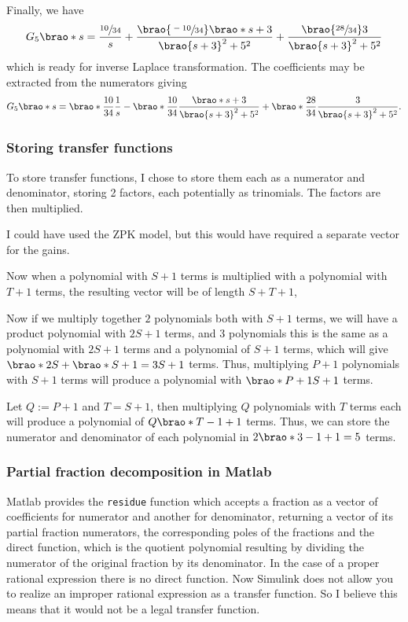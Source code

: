 \documentclass[12pt]{article}
\DeclarePairedDelimiter\brao()%
\begin{document}
Finally, we have 
\begin{equation}
    G_5\brao*s = \frac{\sfrac{10}{34}}s + \frac{\brao{\sfrac{-10}{34}}\brao*{s + 3}}{\brao{s + 3}^2 + 5^2}  + \frac{\brao{\sfrac{28}{34}}3}{\brao{s + 3}^2 + 5^2}
\end{equation}
which is ready for inverse Laplace transformation.
The coefficients may be extracted from the numerators giving
\begin{equation}
    G_5\brao*s = \brao*{\frac{10}{34}}\frac1s - \brao*{\frac{10}{34}}\frac{\brao*{s + 3}}{\brao{s + 3}^2 + 5^2}  + \brao*{\frac{28}{34}}\frac{3}{\brao{s + 3}^2 + 5^2}.
\end{equation}


\subsubsection{Storing transfer functions}

To store transfer functions,
I chose to store them each as a numerator and denominator, storing 2 factors, each potentially as trinomials.
The factors are then multiplied.

I could have used the ZPK model, but this would have required a separate vector for the gains.

Now when a polynomial with $S + 1$ terms is multiplied with a polynomial with $T + 1$ terms, the resulting vector will be of length $S + T + 1$,

Now if we multiply together $2$ polynomials both with $S + 1$ terms,
we will have a product polynomial with $2S + 1$ terms,
and $3$ polynomials this is the same as a polynomial with $2S + 1$ terms and a polynomial of $S + 1$ terms, which
will give $\brao*{2S} + \brao*{S} + 1 = 3S + 1$ terms.
Thus, multiplying $P + 1$ polynomials with $S + 1$ terms will produce a polynomial with $\brao*{P + 1}S + 1$ terms.

Let $Q := P + 1$ and $T = S + 1$, then multiplying $Q$ polynomials with $T$ terms each will produce a polynomial of $Q\brao*{T - 1} + 1$ terms. Thus, we can store the numerator and denominator of each polynomial in $2\brao*{3 - 1} + 1 = 5$ terms.

\subsubsection{Partial fraction decomposition in Matlab}

Matlab provides the \texttt{residue} function which accepts a fraction as a vector of coefficients for numerator and another for denominator,
returning a vector of its partial fraction numerators, the corresponding poles of the fractions and the direct function,
which is the quotient polynomial resulting by dividing the numerator of the original fraction by its denominator.
In the case of a proper rational expression there is no direct function.
Now Simulink does not allow you to realize an improper rational expression as a transfer function.
So I believe this means that it would not be a legal transfer function.
\end{document}
